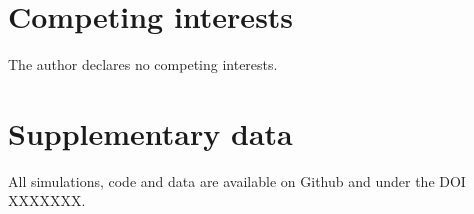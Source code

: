 \documentclass[12pt]{article}
\begin{document}

\section*{Competing interests} %
\label{sec:competing_interests}

The author declares no competing interests.


\section*{Supplementary data} %
\label{sec:supplementary_data}

All simulations, code and data are available on Github and under the DOI XXXXXXX.



\end{document}
